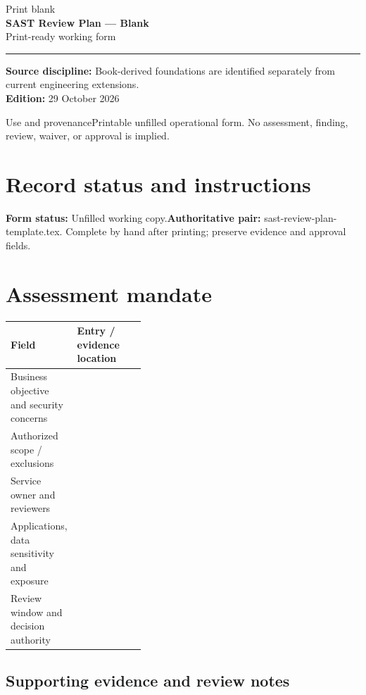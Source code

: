 \documentclass[10pt,letterpaper]{article}
\newcommand{\writearea}[1]{\par\begin{tcolorbox}[colback=white,colframe=linegray,boxrule=0.5pt,height=#1,sharp corners]\mbox{}\end{tcolorbox}\par}
\begin{document}
\hypersetup{pageanchor=false}%
\begin{titlepage}
\vspace*{1.0in}
{\color{bluegray}\Large Print blank}\\[1.0em]
{\color{navy}\Huge\bfseries SAST Review Plan --- Blank}\\[0.7em]
{\Large Print-ready working form}\\[2.0em]
\rule{\linewidth}{1.0pt}
\vfill
\textbf{Source discipline:} Book-derived foundations are identified separately from current engineering extensions.\\
\textbf{Edition:} 29 October 2026
\end{titlepage}\hypersetup{pageanchor=true}
\tableofcontents
\clearpage
\begin{focusbox}{Use and provenance}Printable unfilled operational form. No assessment, finding, review, waiver, or approval is implied.\end{focusbox}
\section{Record status and instructions}
\textbf{Form status:} Unfilled working copy.\quad\textbf{Authoritative pair:} sast-review-plan-template.tex. Complete by hand after printing; preserve evidence and approval fields.

\section{Assessment mandate}
\begin{tabularx}{\linewidth}{@{}p{0.38\linewidth}Y@{}}
\toprule Field & Entry / evidence location\\\midrule
Business objective and security concerns & \\[1.0em]
\midrule
Authorized scope / exclusions & \\[1.0em]
\midrule
Service owner and reviewers & \\[1.0em]
\midrule
Applications, data sensitivity and exposure & \\[1.0em]
\midrule
Review window and decision authority & \\[1.0em]
\midrule
\end{tabularx}
\subsection{Supporting evidence and review notes}
\writearea{1.45in}
\clearpage
\end{document}
